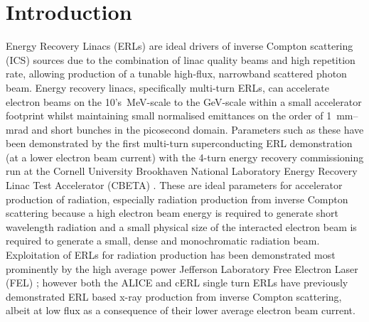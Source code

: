 \documentclass[../main.tex]{subfiles}
\begin{document}
\chapter{Introduction}
\label{Introduction} %

Energy Recovery Linacs (ERLs) are ideal drivers of inverse Compton scattering (ICS) sources due to the combination of linac quality beams and high repetition rate, allowing production of a tunable high-flux, narrowband scattered photon beam. Energy recovery linacs, specifically multi-turn ERLs, can accelerate electron beams on the 10's~\si{\mega\electronvolt}-scale to the \si{\giga\electronvolt}-scale within a small accelerator footprint whilst maintaining small normalised emittances on the order of 1~\si{\milli\meter}--\si{\milli\radian} and short bunches in the picosecond domain. Parameters such as these have been demonstrated by the first multi-turn superconducting ERL demonstration (at a lower electron beam current) with the 4-turn energy recovery commissioning run at the Cornell University Brookhaven National Laboratory Energy Recovery Linac Test Accelerator (CBETA) \cite{hoffstaetter2017cbeta,bartnik2020cbeta}. These are ideal parameters for accelerator production of radiation, especially radiation production from inverse Compton scattering because a high electron beam energy is required to generate short wavelength radiation and a small physical size of the interacted electron beam is required to generate a small, dense and monochromatic radiation beam. Exploitation of ERLs for radiation production has been demonstrated most prominently by the high average power Jefferson Laboratory Free Electron Laser (FEL) \cite{neil2006jlab}; however both the ALICE \cite{priebe2010first} and cERL \cite{akagi2016narrow} single turn ERLs have previously demonstrated ERL based x-ray production from inverse Compton scattering, albeit at low flux as a consequence of their lower average electron beam current. 
\end{document}
